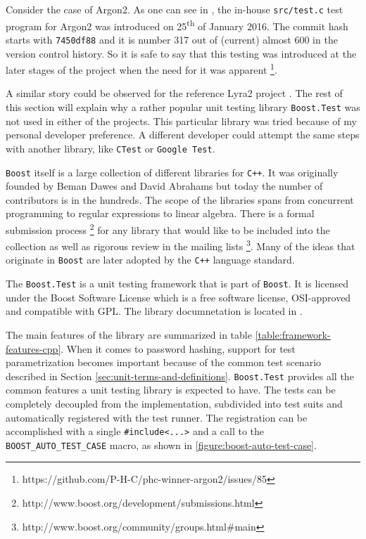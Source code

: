 Consider the case of Argon2. As one can see in \cite{github:2017:argon2}, the in-house \texttt{src/test.c} test program for Argon2 was introduced on 25\textsuperscript{th} of January 2016. The commit hash starts with \texttt{7450df88} and it is number 317 out of (current) almost 600 in the version control history. So it is safe to say that this testing was introduced at the later stages of the project when the need for it was apparent \footnote{https://github.com/P-H-C/phc-winner-argon2/issues/85}.

A similar story could be observed for the reference Lyra2 project \cite{github:2017:lyra}. The rest of this section will explain why a rather popular unit testing library \texttt{Boost.Test} was not used in either of the projects. This particular library was tried because of my personal developer preference. A different developer could attempt the same steps with another library, like \texttt{CTest} or \texttt{Google Test}.

\texttt{Boost} itself is a large collection of different libraries for \texttt{C++}. It was originally founded by Beman Dawes and David Abrahams but today the number of contributors is in the hundreds. The scope of the libraries spans from concurrent programming to regular expressions to linear algebra. There is a formal submission process \footnote{http://www.boost.org/development/submissions.html} for any library that would like to be included into the collection as well as rigorous review in the mailing lists \footnote{http://www.boost.org/community/groups.html\#main}. Many of the ideas that originate in \texttt{Boost} are later adopted by the \texttt{C++} language standard.

The \texttt{Boost.Test} is a unit testing framework that is part of \texttt{Boost}. It is licensed under the Boost Software License which is a free software license, OSI-approved and compatible with GPL. The library documnetation is located in \cite{boost:2017:test-docs}.

The main features of the library are summarized in table \ref{table:framework-features-cpp}. When it comes to password hashing, support for test parametrization becomes important because of the common test scenario described in Section \ref{sec:unit-terms-and-definitions}. \texttt{Boost.Test} provides all the common features a unit testing library is expected to have. The tests can be completely decoupled from the implementation, subdivided  into test suits and automatically registered with the test runner. The registration can be accomplished with a single \texttt{#include<...>} and a call to the \texttt{BOOST_AUTO_TEST_CASE} macro, as shown in \ref{figure:boost-auto-test-case}.

